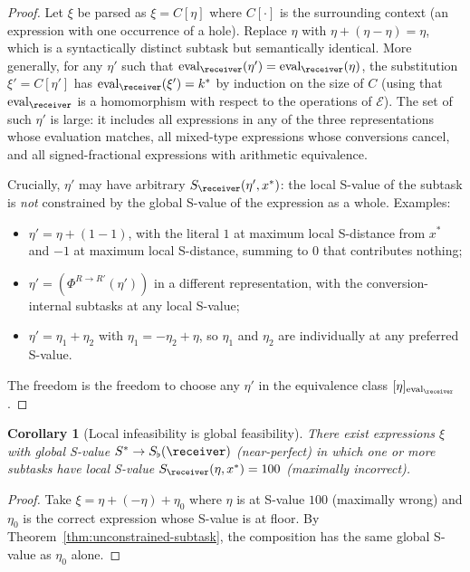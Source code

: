 \documentclass[11pt,a4paper]{article}
\theoremstyle{thmstyle}
\newtheorem{corollary}[theorem]{Corollary}
\theoremstyle{thmstyle}
\theoremstyle{definition}
\theoremstyle{remark}
\DeclareMathOperator{\eval}{eval}
\newcommand{\Expr}{\mathcal{E}}
\newcommand{\Sscalar}{S}
\newcommand{\Sfloor}{S_{\flat}}
\begin{document}
\begin{proof}
Let $\xi$ be parsed as
$\xi = C[\eta]$ where $C[\cdot]$ is the surrounding
context (an expression with one occurrence of a hole).
Replace $\eta$ with $\eta + (\eta - \eta) = \eta$,
which is a syntactically distinct subtask but
semantically identical.  More generally, for any
$\eta'$ such that $\eval_{\receiver}(\eta') =
\eval_{\receiver}(\eta)$, the substitution
$\xi' = C[\eta']$ has
$\eval_{\receiver}(\xi') = k^{*}$ by induction on
the size of $C$ (using that $\eval_{\receiver}$ is
a homomorphism with respect to the operations of
$\Expr$).  The set of such $\eta'$ is large: it
includes all expressions in any of the three
representations whose evaluation matches, all
mixed-type expressions whose conversions cancel,
and all signed-fractional expressions with
arithmetic equivalence.

Crucially, $\eta'$ may have arbitrary
$\Sscalar_{\receiver}(\eta', x^{*})$:
the local S-value of the subtask is
\emph{not} constrained by the global S-value of
the expression as a whole.  Examples:
\begin{itemize}[nosep]
\item $\eta' = \eta + (1 - 1)$, with the literal
      $1$ at maximum local S-distance from $x^{*}$
      and $-1$ at maximum local S-distance, summing
      to $0$ that contributes nothing;
\item $\eta' = (\Phi^{R \to R'}(\eta'))$ in a
      different representation, with the
      conversion-internal subtasks at any
      local S-value;
\item $\eta' = \eta_{1} + \eta_{2}$ with
      $\eta_{1} = -\eta_{2} + \eta$, so $\eta_{1}$
      and $\eta_{2}$ are individually at any
      preferred S-value.
\end{itemize}
The freedom is the freedom to choose any $\eta'$
in the equivalence class
$[\eta]_{\eval_{\receiver}}$.
\end{proof}

\begin{corollary}[Local infeasibility is global feasibility]
\label{cor:local-infeasibility}
There exist expressions $\xi$ with global S-value
$\Sscalar^{*} \to \Sfloor(\receiver)$ (near-perfect)
in which one or more subtasks have local S-value
$\Sscalar_{\receiver}(\eta, x^{*}) = 100$ (maximally
incorrect).
\end{corollary}

\begin{proof}
Take $\xi = \eta + (-\eta) + \eta_{0}$ where
$\eta$ is at S-value $100$ (maximally wrong) and
$\eta_{0}$ is the correct expression whose
S-value is at floor.  By
Theorem~\ref{thm:unconstrained-subtask}, the
composition has the same global S-value as
$\eta_{0}$ alone.
\end{proof}
\end{document}
